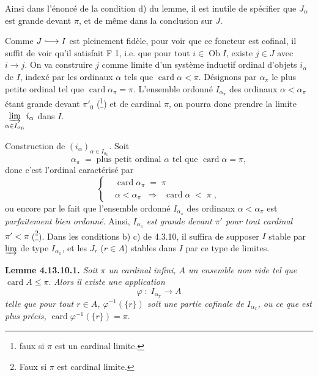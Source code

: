 \documentclass[11pt]{article}
\newcommand{\printedpage}[1]{\marginpar{\footnotesize p.~#1}}
\newcommand{\msp}[1]{\marginpar{\footnotesize [#1]}}
\newcommand{\Ob}{\operatorname{Ob}}
\newcommand{\card}{\operatorname{card}}
\newcommand{\incl}{\lhook\joinrel\longrightarrow}
\begin{document}
Ainsi dans l'énoncé de la condition d) du lemme, il est inutile de spécifier que $J_\alpha$ est grande devant $\pi$, et de même dans la conclusion sur $J$.

Comme $J\incl I$ est pleinement fidèle, pour voir que ce foncteur est cofinal, il suffit de voir qu'il satisfait F 1, i.e. que pour tout $i\in\Ob I$, existe $j\in J$ avec $i\longrightarrow j$. On va construire $j$ comme limite d'un système inductif ordinal d'objets $i_\alpha$ de $I$, indexé par les ordinaux $\alpha$ tels que $\card\alpha<\pi$. Désignons par $\alpha_\pi$ le plus petite ordinal tel que %
\printedpage{111}
\msp{page 298}
$\card\alpha_\pi=\pi$. L'ensemble ordonné $I_{\alpha_\pi}$ des ordinaux $\alpha<\alpha_\pi$ étant grande devant $\pi'_0$ (\footnote[129]{faux si $\pi$ est un cardinal limite.}) et de cardinal $\pi$, on pourra donc prendre la limite $\varinjlim\limits_{\alpha\in I_{\alpha_0}} i_\alpha$ dans $I$. %

Construction de $(i_\alpha)_{\alpha\in I_{\alpha_0}}$. Soit %
\[ \alpha_\pi \; = \; \text{plus petit ordinal } \alpha \text{ tel que } \card\alpha=\pi, \tag*{(1)} \]
donc c'est l'ordinal caractérisé par
\[ \left\{
\begin{aligned}
&\card\alpha_\pi \; = \; \pi \\
&\alpha<\alpha_\pi \;\; \Longrightarrow \;\; \card\alpha \; < \; \pi \; ,
\end{aligned}
\right. \tag*{(2)} \]
ou encore par le fait que l'ensemble ordonné $I_{\alpha_\pi}$ des ordinaux $\alpha<\alpha_\pi$ est \textit{parfaitement bien ordonné}. Ainsi, $I_{\alpha_\pi}$ \textit{est grande devant $\pi'$ pour tout cardinal $\pi'<\pi$} (\footnote[130]{Faux si $\pi$ est cardinal limite.}). Dans les conditions b) c) de 4.3.10, il suffira de supposer $I$ stable par $\varinjlim$ de type $I_{\alpha_\pi}$, et les $J_r$ ($r\in A$) stables dans $I$ par ce type de limites. %

\textbf{Lemme 4.13.10.1.} \textit{Soit $\pi$ un cardinal infini, $A$ un ensemble non vide tel que} $\card A\leqslant\pi$. \textit{Alors}
\msp{page 299}
\textit{il existe une application}
\[ \varphi \; : \; I_{\alpha_\pi} \longrightarrow A \]
\textit{telle que pour tout $r\in A$, $\varphi^{-1}(\{r\})$ soit une partie cofinale de $I_{\alpha_\pi}$, ou ce que est plus précis,} $\card\varphi^{-1}(\{r\})=\pi$. %
\end{document}
